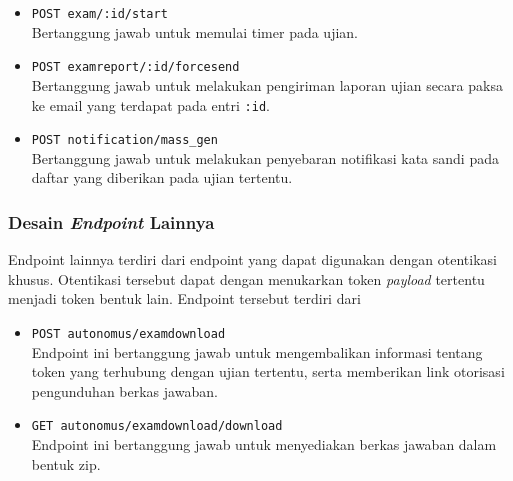 \begin{itemize}
        \item \texttt{POST exam/:id/start} \\
            Bertanggung jawab untuk memulai timer pada ujian.
            
        \item \texttt{POST examreport/:id/forcesend} \\
            Bertanggung jawab untuk melakukan pengiriman laporan ujian secara
            paksa ke email yang terdapat pada entri \texttt{:id}.
            
        \item \texttt{POST notification/mass\_gen} \\
            Bertanggung jawab untuk melakukan penyebaran notifikasi kata sandi
            pada daftar yang diberikan pada ujian tertentu.
    \end{itemize}
    
\subsubsection{Desain \textit{Endpoint} Lainnya} Endpoint lainnya terdiri dari
    endpoint yang dapat digunakan dengan otentikasi khusus. Otentikasi tersebut
    dapat dengan menukarkan token \textit{payload} tertentu menjadi token bentuk
    lain. Endpoint tersebut terdiri dari
    \begin{itemize}
        \item \texttt{POST autonomus/examdownload} \\
            Endpoint ini bertanggung jawab untuk mengembalikan informasi tentang
            token yang terhubung dengan ujian tertentu, serta memberikan link
            otorisasi pengunduhan berkas jawaban.
            
        \item \texttt{GET autonomus/examdownload/download} \\
            Endpoint ini bertanggung jawab untuk menyediakan berkas jawaban
            dalam bentuk zip.
    \end{itemize}
    
